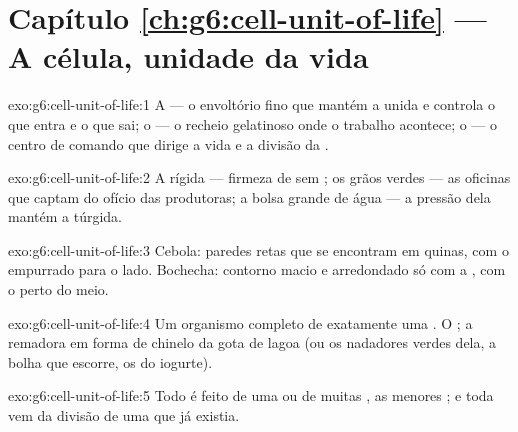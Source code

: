 \section*{Capítulo \ref{ch:g6:cell-unit-of-life} --- A célula, unidade da vida}

\begin{solution}{exo:g6:cell-unit-of-life:1}
A  --- o envoltório fino que mantém a  unida e controla
o que entra e o que sai; o  --- o recheio gelatinoso onde o
trabalho acontece; o  --- o centro de comando que dirige a vida
e a divisão da .
\end{solution}

\begin{solution}{exo:g6:cell-unit-of-life:2}
A  rígida --- firmeza de  sem ; os grãos
verdes --- as oficinas que captam  do ofício das produtoras; a bolsa
grande de água --- a pressão dela mantém a  túrgida.
\end{solution}

\begin{solution}{exo:g6:cell-unit-of-life:3}
Cebola: paredes retas que se encontram em quinas, com o 
empurrado para o lado. Bochecha: contorno macio e arredondado só com a
, com o  perto do meio.
\end{solution}

\begin{solution}{exo:g6:cell-unit-of-life:4}
Um organismo completo de exatamente uma . O ; a remadora
em forma de chinelo da gota de lagoa (ou os nadadores verdes dela, a
bolha que escorre, os  do iogurte).
\end{solution}

\begin{solution}{exo:g6:cell-unit-of-life:5}
Todo  é feito de uma ou de muitas , as menores ; e toda  vem da divisão de uma  que já existia.
\end{solution}

